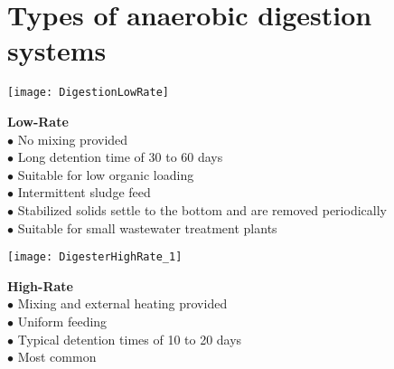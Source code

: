 \section{Types of anaerobic digestion systems}                

\vspace{1cm}
\begin{minipage}{.25\textwidth}
      \texttt{[image: DigestionLowRate]}
    \end{minipage}
\hspace{1cm}
\begin{minipage}{.35\textwidth}
        \end{minipage}
\begin{minipage}{.50\textwidth}\textbf{Low-Rate}\\
$\bullet$ No mixing provided\\
$\bullet$ Long detention time of 30 to 60 days\\
$\bullet$ Suitable for low organic loading\\
$\bullet$ Intermittent sludge feed\\
$\bullet$ Stabilized solids settle to the bottom and are removed periodically\\
$\bullet$ Suitable for small wastewater treatment plants\\ \end{minipage}

\vspace{1cm}

\begin{minipage}{.25\textwidth}
      \texttt{[image: DigesterHighRate\_1]}
    \end{minipage}
    \hspace{1cm}
\begin{minipage}{.35\textwidth}
        \end{minipage}
\begin{minipage}{.50\textwidth}\textbf{High-Rate}\\
$\bullet$ Mixing and external heating provided\\
$\bullet$ Uniform feeding\\
$\bullet$ Typical detention times of 10 to 20 days\\
$\bullet$ Most common\\  \end{minipage}

\vspace{1cm}

